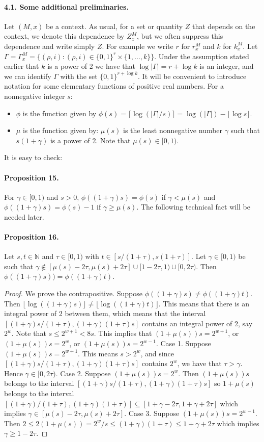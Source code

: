 \documentclass[10pt,a4paper]{article}
\begin{document}
\paragraph{4.1. Some additional preliminaries.}
Let $(M,x)$ be a context. As usual, for a set or quantity $Z$ that depends on the context, we denote this dependence by $Z_x^M$, but we often suppress this dependence and write simply $Z$. For example we write $r$ for $r_x^M$ and $k$ for $k_x^M$.
Let $\Gamma=\Gamma_x^M=\{(\rho,i):(\rho,i)\in\{0,1\}^r\times\{1,\ldots,k\}\}$. Under the assumption stated earlier that $k$ is a power of 2 we have that $\log|\Gamma|=r+\log k$ is an integer, and we can identify $\Gamma$ with the set $\{0,1\}^{r+\log k}$.
It will be convenient to introduce notation for some elementary functions of positive real numbers. For a nonnegative integer $s$:
\begin{itemize}
\item $\phi$ is the function given by $\phi(s)=\lceil\log(|\Gamma|/s)\rceil=\log(|\Gamma|)-\lfloor\log s\rfloor$.
\item $\mu$ is the function given by: $\mu(s)$ is the least nonnegative number $\gamma$ such that $s(1+\gamma)$ is a power of 2. Note that $\mu(s)\in[0,1)$.
\end{itemize}
It is easy to check:
\paragraph{Proposition 15.}
For $\gamma\in[0,1)$ and $s>0$, $\phi((1+\gamma)s)=\phi(s)$ if $\gamma<\mu(s)$ and $\phi((1+\gamma)s)=\phi(s)-1$ if $\gamma\geq\mu(s)$.
The following technical fact will be needed later.
\paragraph{Proposition 16.}
Let $s,t\in\mathbb N$ and $\tau\in[0,1)$ with $t\in[s/(1+\tau),s(1+\tau)]$. Let $\gamma\in[0,1)$ be such that $\gamma\notin[\mu(s)-2\tau,\mu(s)+2\tau]\cup[1-2\tau,1)\cup[0,2\tau)$. Then $\phi((1+\gamma)s))=\phi((1+\gamma)t)$.
\begin{proof}
We prove the contrapositive. Suppose $\phi((1+\gamma)s)\neq\phi((1+\gamma)t)$. Then $\lfloor\log((1+\gamma)s)\rfloor\neq\lfloor\log((1+\gamma)t)\rfloor$. This means that there is an integral power of 2 between them, which means that the interval $[(1+\gamma)s/(1+\tau),(1+\gamma)(1+\tau)s]$ contains an integral power of 2, say $2^w$. Note that $s\leq2^{w+1}<8s$. This implies that $(1+\mu(s))s=2^{w+1}$, or $(1+\mu(s))s=2^w$, or $(1+\mu(s))s=2^{w-1}$.
Case 1. Suppose $(1+\mu(s))s=2^{w+1}$. This means $s>2^w$, and since $[(1+\gamma)s/(1+\tau),(1+\gamma)(1+\tau)s]$ contains $2^w$, we have that $\tau>\gamma$. Hence $\gamma\in[0,2\tau)$.
Case 2. Suppose $(1+\mu(s))s=2^w$. Then $(1+\mu(s))s$ belongs to the interval $[(1+\gamma)s/(1+\tau),(1+\gamma)(1+\tau)s]$ so $1+\mu(s)$ belongs to the interval $[(1+\gamma)/(1+\tau),(1+\gamma)(1+\tau)]\subseteq[1+\gamma-2\tau,1+\gamma+2\tau]$ which implies $\gamma\in[\mu(s)-2\tau,\mu(s)+2\tau]$.
Case 3. Suppose $(1+\mu(s))s=2^{w-1}$. Then $2\leq2(1+\mu(s))=2^w/s\leq(1+\gamma)(1+\tau)\leq1+\gamma+2\tau$ which implies $\gamma\geq1-2\tau$.
\end{proof}
\end{document}
